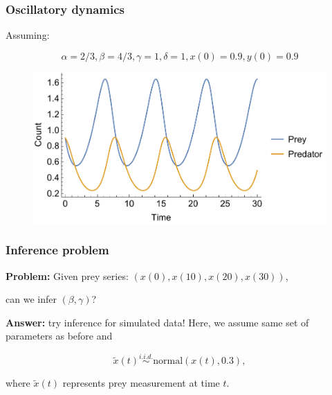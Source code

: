 \documentclass[handout]{beamer}
\begin{document}
\begin{frame}
	\frametitle{Oscillatory dynamics}
	
	Assuming:
	
	\begin{equation}
	\alpha=2/3, \beta=4/3, \gamma=1, \delta=1, x(0)=0.9, y(0)=0.9
	\end{equation}
	
	\begin{figure}[ht]
		\centerline{\includegraphics[width=1\textwidth]{./figures/lotka-volterra.pdf}}
	\end{figure}
		
\end{frame}


\begin{frame}
	\frametitle{Inference problem}
	
	\textbf{Problem:} Given prey series: $(x(0), x(10), x(20), x(30))$, 
	
	\vspace{0.2cm}
	
	can we infer $(\beta, \gamma)$?
	
	\vspace{0.5cm}
	
	\textbf{Answer:} try inference for simulated data! Here, we assume same set of parameters as before and
	
	\begin{equation}
	\tilde{x}(t) \stackrel{i.i.d.}{\sim} \text{normal}(x(t), 0.3),
	\end{equation}
	
	where $\tilde{x}(t)$ represents prey measurement at time $t$.
	
\end{frame}
\end{document}
